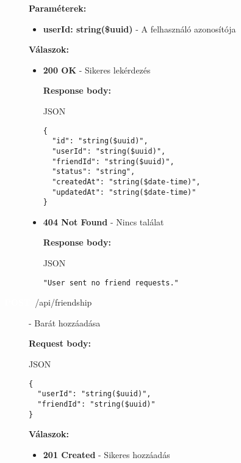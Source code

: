 \documentclass[12pt]{report}
\newcommand{\httpPost}[1]{\colorbox{postColor}{\textbf{\textcolor{white}{POST}}}~#1}
\begin{document}
\begin{description}
    \vspace{0.5cm}
    \textbf{Paraméterek:}
    \begin{itemize}
      \item \textbf{userId: string(\$uuid)} - A felhasználó azonosítója
    \end{itemize}

    \vspace{0.5cm}
    \textbf{Válaszok:}
    \begin{itemize}
      \item \textbf{200 OK} - Sikeres lekérdezés

        \textbf{Response body:}
        \begin{codeblock}{JSON}
          \begin{verbatim}
{
  "id": "string($uuid)",
  "userId": "string($uuid)",
  "friendId": "string($uuid)",
  "status": "string",
  "createdAt": "string($date-time)",
  "updatedAt": "string($date-time)"
}
          \end{verbatim}
        \end{codeblock}

      \item \textbf{404 Not Found} - Nincs találat

        \textbf{Response body:}
        \begin{codeblock}{JSON}
          \begin{verbatim}
"User sent no friend requests."
          \end{verbatim}
        \end{codeblock}
      \end{itemize}

  \item[\httpPost{/api/friendship}] - Barát hozzáadása
  
    \vspace{0.5cm}
    \textbf{Request body:}
    \begin{codeblock}{JSON}
      \begin{verbatim}
{
  "userId": "string($uuid)",
  "friendId": "string($uuid)"
}
      \end{verbatim}
    \end{codeblock}

    \vspace{0.5cm}
    \textbf{Válaszok:}
    \begin{itemize}
      \item \textbf{201 Created} - Sikeres hozzáadás


\end{itemize}
\end{description}
\end{document}
